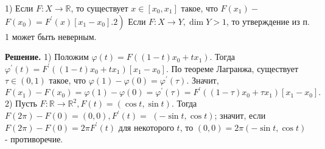 \begin{task}
    1) Если $F: X \rightarrow \mathbb{R}$, то существует $x \in\left[x_0, x_1\right]$ такое, что $F\left(x_1\right)-$ $\left.F\left(x_0\right)=F^{\prime}(x)\left[x_1-x_0\right] .2\right)$ Если $F: X \rightarrow Y, \operatorname{dim} Y>1$, то утверждение из п. 1 может быть неверным.
    
    \textbf{Решение.} 1) Положим $\varphi(t)=F\left((1-t) x_0+t x_1\right)$. Тогда $\varphi^{\prime}(t)=F^{\prime}\left((1-t) x_0+t x_1\right)\left[x_1-x_0\right]$. По теореме Лагранжа, существует $\tau \in(0,1)$ такое, что $\varphi(1)-\varphi(0)=\varphi^{\prime}(\tau)$. Значит,
    $$
    F\left(x_1\right)-F\left(x_0\right)=\varphi(1)-\varphi(0)=\varphi^{\prime}(\tau)=F^{\prime}\left((1-\tau) x_0+\tau x_1\right)\left[x_1-x_0\right] .
    $$
    2) Пусть $F: \mathbb{R} \rightarrow \mathbb{R}^2, F(t)=(\cos t, \sin t)$. Тогда $F(2 \pi)-F(0)=(0,0), F^{\prime}(t)=$ $(-\sin t, \cos t)$; значит, если $F(2 \pi)-F(0)=2 \pi F^{\prime}(t)$ для некоторого $t$, то $(0,0)=2 \pi(-\sin t, \cos t)$ - противоречие.
    
\end{task}